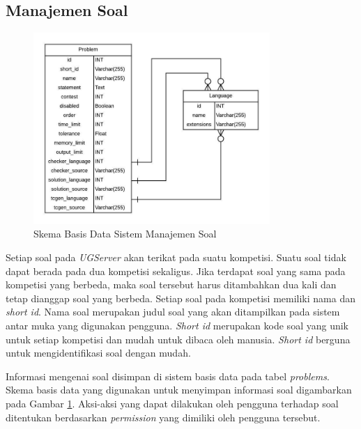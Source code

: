 
\subsection{Manajemen Soal}

\begin{figure}[ht!]
    \centering
    \includegraphics[width=0.8\textwidth]{images/problem-schema}
    \caption{Skema Basis Data Sistem Manajemen Soal}
    \label{fig:problem-schema}
\end{figure}

\par Setiap soal pada \textit{UGServer} akan terikat pada suatu kompetisi. Suatu soal tidak dapat berada pada dua kompetisi sekaligus. Jika terdapat soal yang sama pada kompetisi yang berbeda, maka soal tersebut harus ditambahkan dua kali dan tetap dianggap soal yang berbeda. Setiap soal pada kompetisi memiliki nama dan \textit{short id}. Nama soal merupakan judul soal yang akan ditampilkan pada sistem antar muka yang digunakan pengguna. \textit{Short id} merupakan kode soal yang unik untuk setiap kompetisi dan mudah untuk dibaca oleh manusia. \textit{Short id} berguna untuk mengidentifikasi soal dengan mudah.

\par Informasi mengenai soal disimpan di sistem basis data pada tabel \textit{problems}. Skema basis data yang digunakan untuk menyimpan informasi soal digambarkan pada Gambar \ref{fig:problem-schema}. Aksi-aksi yang dapat dilakukan oleh pengguna terhadap soal ditentukan berdasarkan \textit{permission} yang dimiliki oleh pengguna tersebut.


